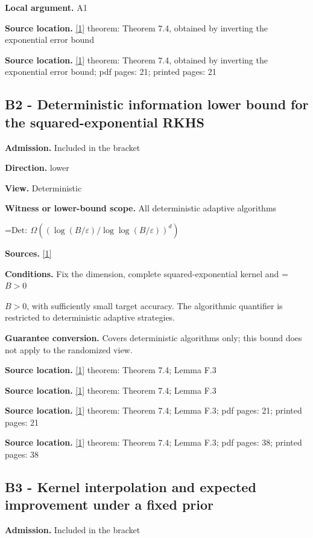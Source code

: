 \documentclass[10pt,a4paper]{article}
\newcommand{\AtlasMath}[1]{\par\begingroup\centering\setbox0=\hbox{$\displaystyle #1$}\ifdim\wd0>1.4\linewidth\typeout{ATLAS WIDE FORMULA: \the\wd0}\fi\ifdim\wd0>\linewidth\resizebox{\linewidth}{!}{\box0}\else\box0\fi\par\endgroup}
\newcommand{\AtlasInlineMath}[1]{\begingroup\setbox0=\hbox{$#1$}\ifdim\wd0>.4\linewidth\endgroup\AtlasMath{#1}\else\endgroup$#1$\fi}
\begin{document}
\textbf{Local argument.} A1

\textbf{Source location.} \href{https://arxiv.org/html/2607.29245v2}{[1]} theorem: Theorem 7.4, obtained by inverting the exponential error bound

\textbf{Source location.} \href{https://arxiv.org/html/2607.29245v2}{[1]} theorem: Theorem 7.4, obtained by inverting the exponential error bound; pdf pages: 21; printed pages: 21

\subsection{B2 - Deterministic information lower bound for the squared-exponential RKHS}
\textbf{Admission.} Included in the bracket

\textbf{Direction.} lower

\textbf{View.} Deterministic

\textbf{Witness or lower-bound scope.} All deterministic adaptive algorithms

\AtlasMath{\mathrm{Det}:\ \Omega\!\left((\log(B/\varepsilon)/\log\log(B/\varepsilon))^d\right)}
\textbf{Sources.} \href{https://arxiv.org/html/2607.29245v2}{[1]}

\textbf{Conditions.} Fix the dimension, complete squared-exponential kernel and \AtlasInlineMath{B>0}, with sufficiently small target accuracy. The algorithmic quantifier is restricted to deterministic adaptive strategies.

\textbf{Guarantee conversion.} Covers deterministic algorithms only; this bound does not apply to the randomized view.

\textbf{Source location.} \href{https://arxiv.org/html/2607.29245v2}{[1]} theorem: Theorem 7.4; Lemma F.3

\textbf{Source location.} \href{https://arxiv.org/html/2607.29245v2}{[1]} theorem: Theorem 7.4; Lemma F.3

\textbf{Source location.} \href{https://arxiv.org/html/2607.29245v2}{[1]} theorem: Theorem 7.4; Lemma F.3; pdf pages: 21; printed pages: 21

\textbf{Source location.} \href{https://arxiv.org/html/2607.29245v2}{[1]} theorem: Theorem 7.4; Lemma F.3; pdf pages: 38; printed pages: 38

\subsection{B3 - Kernel interpolation and expected improvement under a fixed prior}
\textbf{Admission.} Included in the bracket
\end{document}
